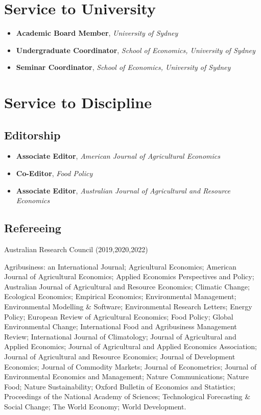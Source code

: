 \documentclass[10pt]{article}
\begin{document}
	\bigskip
	
	\section*{Service to University}
	\begin{itemize}
		\item {} \textbf{Academic Board Member}, \textsl{University of Sydney}
		\item {} \textbf{Undergraduate Coordinator}, \textsl{School of Economics, University of Sydney}
		\item {} \textbf{Seminar Coordinator}, \textsl{School of Economics, University of Sydney}
	\end{itemize}
	
	
	\section*{Service to Discipline}
	
	\subsection*{Editorship}
	\begin{itemize}
		\item {} \textbf{Associate Editor}, \textsl{American Journal of Agricultural Economics}
		\item {} \textbf{Co-Editor}, \textsl{Food Policy}
		\item {} \textbf{Associate Editor}, \textsl{Australian Journal of Agricultural and Resource Economics}
	\end{itemize}
	
	\subsection*{Refereeing}
	Australian Research Council (2019,2020,2022)
	
	\medskip
	
	Agribusiness: an International Journal; Agricultural Economics; American Journal of Agricultural Economics; Applied Economics Perspectives and Policy; Australian Journal of Agricultural and Resource Economics; Climatic Change; Ecological Economics; Empirical Economics; Environmental Management; Environmental Modelling \& Software; Environmental Research Letters; Energy Policy; European Review of Agricultural Economics; Food Policy; Global Environmental Change; International Food and Agribusiness Management Review; International Journal of Climatology; Journal of Agricultural and Applied Economics; Journal of Agricultural and Applied Economics Association; Journal of Agricultural and Resource Economics; Journal of Development Economics; Journal of Commodity Markets; Journal of Econometrics; Journal of Environmental Economics and Management; Nature Communications; Nature Food; Nature Sustainability; Oxford Bulletin of Economics and Statistics; Proceedings of the National Academy of Sciences; Technological Forecasting \& Social Change; The World Economy; World Development.
	
\end{document}
